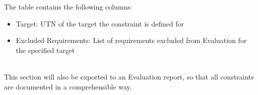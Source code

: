 The table contains the following columns:

\begin{itemize}  
  \item Target: UTN of the target the constraint is defined for
  \item Excluded Requirements: List of requirements excluded from Evaluation for the specified target
\end{itemize}
\ \\

This section will also be exported to an Evaluation report, so that all constraints 
are documented in a comprehensible way.
